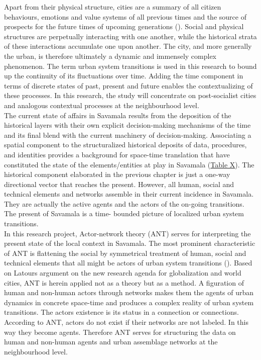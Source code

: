 \documentclass[11pt]{report}
\begin{document}
{{{{Apart from their physical structure, cities are a summary of all citizen behaviours, emotions and value systems of all previous times and the source of prospects for the future times of upcoming generations  (\href{Stojkov}{\citealt{stojkov_grad_2013}}).
Social and physical structures are perpetually interacting with one another, while the historical strata of these interactions accumulate one upon another. The city, and more generally the urban, is therefore ultimately a dynamic and immensely complex phenomenon. The term urban system transitions is used in this research to bound up the continuity of its fluctuations over time. Adding the time component in terms of discrete states of past, present and future enables the contextualizing of these processes. In this research, the study will concentrate on post-socialist cities and analogous contextual processes at the neighbourhood level.
\\

The current state of affairs in Savamala results from the deposition of the historical layers with their own explicit decision-making mechanisms of the time and its final blend with the current machinery of decision-making. Associating a spatial component to the structuralized historical deposits of data, procedures, and identities provides a background for space-time translation that have constituted the state of the elements/entities at play in Savamala (\href{ref}{Table X}). 
The historical component elaborated in the previous chapter is just a one-way directional vector that reaches the present. However, all human, social and technical elements and networks assemble in their current incidence in Savamala. They are actually the active agents and the actors of the on-going transitions. The present of Savamala is a time- bounded picture of localized urban system transitions. 
\\

In this research project, Actor-network theory (ANT) serves for interpreting the present state of the local context in Savamala. The most prominent characteristic of ANT is flattening the social by symmetrical treatment of human, social and technical elements that all might be actors of urban system transitions (\href{Latour}{\citealt{latour_reassembling_2005}}). 
Based on Latours argument on the new research agenda for globalization and world cities, ANT is herein applied not as a theory but as a method. A figuration of human and non-human actors through networks
makes them the agents of urban dynamics in concrete space-time and produces a complex reality of urban system transitions. The actors existence is its status in a connection or connections. According to ANT, actors do not exist if their networks are not labeled. In this way they become agents. Therefore ANT serves for structuring the data on human and non-human agents and urban assemblage networks at the neighbourhood level.
\\

}}}}
\end{document}
